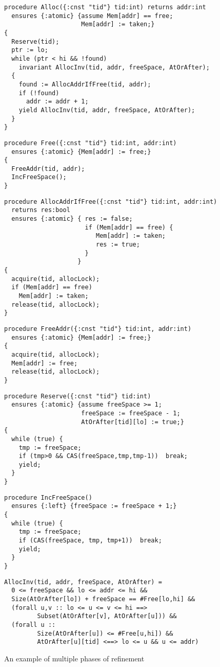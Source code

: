\begin{figure}
\begin{small}
\begin{verbatim}
procedure Alloc({:cnst "tid"} tid:int) returns addr:int
  ensures {:atomic} {assume Mem[addr] == free;  
                     Mem[addr] := taken;}
{
  Reserve(tid);         
  ptr := lo;
  while (ptr < hi && !found)
    invariant AllocInv(tid, addr, freeSpace, AtOrAfter);
  { 
    found := AllocAddrIfFree(tid, addr);
    if (!found) 
      addr := addr + 1;
    yield AllocInv(tid, addr, freeSpace, AtOrAfter);
  }
}
\end{verbatim}
\begin{verbatim}
procedure Free({:cnst "tid"} tid:int, addr:int)
  ensures {:atomic} {Mem[addr] := free;}
{
  FreeAddr(tid, addr);  
  IncFreeSpace(); 
}
\end{verbatim}
\begin{verbatim}
procedure AllocAddrIfFree({:cnst "tid"} tid:int, addr:int) 
  returns res:bool
  ensures {:atomic} { res := false;
                      if (Mem[addr] == free) {
                         Mem[addr] := taken; 
                         res := true;
                      }  
                    }
{
  acquire(tid, allocLock);
  if (Mem[addr] == free)
    Mem[addr] := taken;   
  release(tid, allocLock);
}
\end{verbatim}
\begin{verbatim}
procedure FreeAddr({:cnst "tid"} tid:int, addr:int)
  ensures {:atomic} {Mem[addr] := free;}
{
  acquire(tid, allocLock);
  Mem[addr] := free;   
  release(tid, allocLock);
}
\end{verbatim}
\begin{verbatim}
procedure Reserve({:cnst "tid"} tid:int) 
  ensures {:atomic} {assume freeSpace >= 1; 
                     freeSpace := freeSpace - 1;
                     AtOrAfter[tid][lo] := true;}
{
  while (true) {
    tmp := freeSpace;
    if (tmp>0 && CAS(freeSpace,tmp,tmp-1))  break;
    yield;
  }
}
\end{verbatim}
\begin{verbatim}
procedure IncFreeSpace() 
  ensures {:left} {freeSpace := freeSpace + 1;}
{
  while (true) {
    tmp := freeSpace;
    if (CAS(freeSpace, tmp, tmp+1))  break;
    yield;
  }
}
\end{verbatim}
\begin{verbatim}
AllocInv(tid, addr, freeSpace, AtOrAfter) = 
  0 <= freeSpace && lo <= addr <= hi &&
  Size(AtOrAfter[lo]) + freeSpace == #Free[lo,hi] && 
  (forall u,v :: lo <= u <= v <= hi ==> 
         Subset(AtOrAfter[v], AtOrAfter[u])) &&
  (forall u :: 
         Size(AtOrAfter[u]) <= #Free[u,hi]) &&
         AtOrAfter[u][tid] <==> lo <= u && u <= addr)
\end{verbatim}
\end{small}
\caption{An example of multiple phases of refinement}
\label{fig:refinement}
\end{figure}

